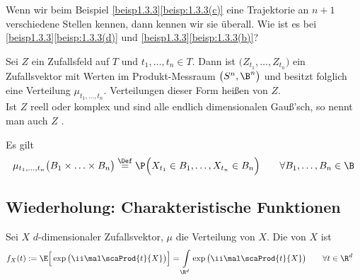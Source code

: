 
\begin{aufgabenr}\label{aufg:5}
	Wenn wir beim Beispiel \ref{beisp1.3.3}\ref{beisp:1.3.3(c)} eine Trajektorie an $n+1$ verschiedene Stellen kennen, dann kennen wir sie überall.
	Wie ist es bei \ref{beisp1.3.3}\ref{beisp:1.3.3(d)} und \ref{beisp1.3.3}\ref{beisp:1.3.3(b)}?
\end{aufgabenr}

\setcounter{satz}{4} %

\begin{definition}\label{def:1.3.5}
	Sei $Z$ ein Zufallsfeld auf $T$ und $t_1,\ldots,t_n\in T$.
	Dann ist $\big(Z_{t_1},\ldots,Z_{t_n}\big)$ ein Zufallsvektor mit Werten im Produkt-Messraum $\big(S^n,\B^n\big)$ und besitzt folglich eine Verteilung $\mu_{t_1,\ldots,t_n}$.
	Verteilungen dieser Form heißen  von $Z$. \\
	Ist $Z$ reell oder komplex und sind alle endlich dimensionalen Gauß'sch, so nennt man auch $Z$ .
\end{definition}

\begin{bemerkung}
	Es gilt
	\begin{align*}
		\mu_{t_1,\ldots,t_n}\big(B_1\times\ldots\times B_n\big)
		\overset{\Def}{=}
		\P\Big(X_{t_1}\in B_1,\ldots,X_{t_n}\in B_n\Big)\qquad\forall B_1,\ldots,B_n\in\B
	\end{align*}
\end{bemerkung}

\subsection*{Wiederholung: Charakteristische Funktionen}
\begin{defi}
	Sei $X$ $d$-dimensionaler Zufallsvektor, $\mu$ die Verteilung von $X$.
	Die  von $X$ ist
	\begin{align*}
		f_X(t)&:=\E\Big[\exp\big(\ii\mal\scaProd{t}{X}\big)\Big]
		=\int\limits_{\R^d}\exp\big(\ii\mal\scaProd{t}{X}\big)\qquad\forall t\in\R^d
	\end{align*}
\end{defi}

